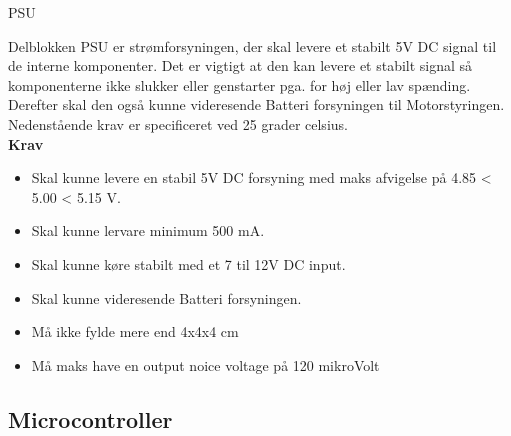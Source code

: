 \begin{PartBlokDescription}{PSU}{}
\BlokSpacer{0cm}
\end{PartBlokDescription}

Delblokken PSU er strømforsyningen, der skal levere et stabilt 5V DC signal til de interne komponenter. Det er vigtigt at den kan levere et stabilt signal så komponenterne ikke slukker eller genstarter pga. for høj eller lav spænding.
Derefter skal den også kunne videresende Batteri forsyningen til Motorstyringen.
Nedenstående krav er specificeret ved 25 grader celsius. 
\\
\textbf{Krav}
\begin{itemize}
\item Skal kunne levere en stabil 5V DC forsyning  med maks afvigelse på  4.85 < 5.00 < 5.15 V.
\item Skal kunne lervare minimum 500 mA.
\item Skal kunne køre stabilt med et 7 til 12V DC input.
\item Skal kunne videresende Batteri forsyningen.
\item Må ikke fylde mere end 4x4x4 cm
\item Må maks have en output noice voltage på 120 mikroVolt
\end{itemize}

\subsection{Microcontroller}


